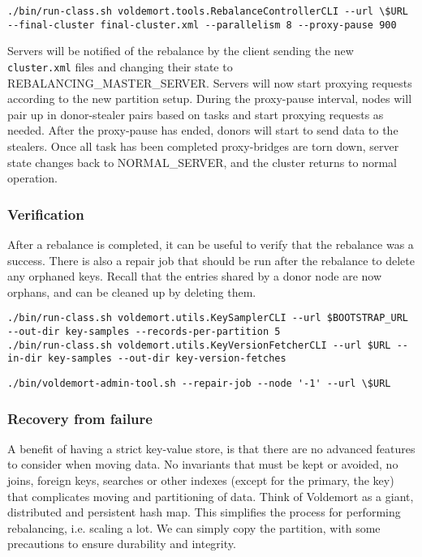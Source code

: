 \begin{lstlisting}[style=customc, caption=Sample command to execute the rebalance. Parallelism defines how many tasks can be run at the same time.]
./bin/run-class.sh voldemort.tools.RebalanceControllerCLI --url \$URL  --final-cluster final-cluster.xml --parallelism 8 --proxy-pause 900
\end{lstlisting}

Servers will be notified of the rebalance by the client sending the new \texttt{cluster.xml} files and changing their state to REBALANCING\_MASTER\_SERVER. Servers will now start proxying requests according to the new partition setup. During the proxy-pause interval, nodes will pair up in donor-stealer pairs based on tasks and start proxying requests as needed. After the proxy-pause has ended, donors will start to send data to the stealers. Once all task has been completed proxy-bridges are torn down, server state changes back to NORMAL\_SERVER, and the cluster returns to normal operation.

\subsubsection{Verification}
After a rebalance is completed, it can be useful to verify that the rebalance was a success. There is also a repair job that should be run after the rebalance to delete any orphaned keys. Recall that the entries shared by a donor node are now orphans, and can be cleaned up by deleting them.

\begin{lstlisting}[style=customc, caption=Commands for pulling a key sample from a store and the versioned data objects stored under the keys. These are used to verify that the rebalance did not corrupt data]
./bin/run-class.sh voldemort.utils.KeySamplerCLI --url $BOOTSTRAP_URL --out-dir key-samples --records-per-partition 5
./bin/run-class.sh voldemort.utils.KeyVersionFetcherCLI --url $URL --in-dir key-samples --out-dir key-version-fetches
\end{lstlisting}

\begin{lstlisting}[style=customc, caption=Sample repair job script. Passing -1 as node will run the script on all nodes.]
./bin/voldemort-admin-tool.sh --repair-job --node '-1' --url \$URL
\end{lstlisting}

\subsubsection{Recovery from failure}
A benefit of having a strict key-value store, is that there are no advanced features to consider when moving data. No invariants that must be kept or avoided, no joins, foreign keys, searches or other indexes (except for the primary, the key) that complicates moving and partitioning of data. 
Think of Voldemort as a giant, distributed and persistent hash map.
This simplifies the process for performing rebalancing, i.e. scaling a lot. We can simply copy the partition, with some precautions to ensure durability and integrity.

